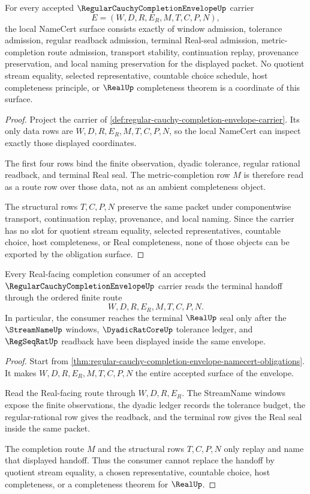 \begin{theorem}
\label{thm:regular-cauchy-completion-envelope-namecert-obligations}
For every accepted $\RegularCauchyCompletionEnvelopeUp$ carrier
$$
E=(W,D,R,E_R,M,T,C,P,N),
$$
the local NameCert surface consists exactly of window admission, tolerance admission, regular readback admission, terminal Real-seal admission, metric-completion route admission, transport stability, continuation replay, provenance preservation, and local naming preservation for the displayed packet. No quotient stream equality, selected representative, countable choice schedule, host completeness principle, or $\RealUp$ completeness theorem is a coordinate of this surface.
\end{theorem}
\begin{proof}
Project the carrier of \autoref{def:regular-cauchy-completion-envelope-carrier}. Its only data rows are $W,D,R,E_R,M,T,C,P,N$, so the local NameCert can inspect exactly those displayed coordinates.

The first four rows bind the finite observation, dyadic tolerance, regular rational readback, and terminal Real seal. The metric-completion row $M$ is therefore read as a route row over those data, not as an ambient completeness object.

The structural rows $T,C,P,N$ preserve the same packet under componentwise transport, continuation replay, provenance, and local naming. Since the carrier has no slot for quotient stream equality, selected representatives, countable choice, host completeness, or Real completeness, none of those objects can be exported by the obligation surface.
\end{proof}

\begin{theorem}
\label{thm:regular-cauchy-completion-envelope-real-handoff}
Every Real-facing completion consumer of an accepted $\RegularCauchyCompletionEnvelopeUp$ carrier reads the terminal handoff through the ordered finite route
$$
W,D,R,E_R,M,T,C,P,N.
$$
In particular, the consumer reaches the terminal $\RealUp$ seal only after the $\StreamNameUp$ windows, $\DyadicRatCoreUp$ tolerance ledger, and $\RegSeqRatUp$ readback have been displayed inside the same envelope.
\end{theorem}
\begin{proof}
Start from \autoref{thm:regular-cauchy-completion-envelope-namecert-obligations}. It makes $W,D,R,E_R,M,T,C,P,N$ the entire accepted surface of the envelope.

Read the Real-facing route through $W,D,R,E_R$. The StreamName windows expose the finite observations, the dyadic ledger records the tolerance budget, the regular-rational row gives the readback, and the terminal row gives the Real seal inside the same packet.

The completion route $M$ and the structural rows $T,C,P,N$ only replay and name that displayed handoff. Thus the consumer cannot replace the handoff by quotient stream equality, a chosen representative, countable choice, host completeness, or a completeness theorem for $\RealUp$.
\end{proof}

